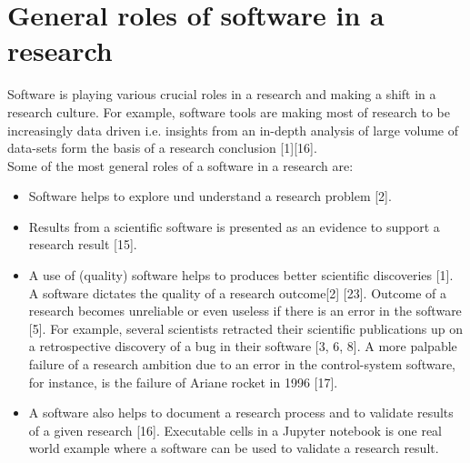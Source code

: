 \section{General roles of software in a research }
Software is playing various crucial roles in a research and making a shift in a research culture. For example, software tools are making most of research to be increasingly data driven i.e. insights from an in-depth analysis of large volume of data-sets form the basis of a research conclusion [1][16].\\
Some of the most general roles of a software in a research are:
\vspace{-5mm}   %
\begin{itemize}[noitemsep,topsep=0pt]
    \item Software helps to explore und understand a research problem [2].
    \item Results from a scientific software is presented as an evidence to support a research result [15]. 
    \item A use of (quality) software helps to produces better scientific discoveries [1]. A software dictates the quality of a research outcome[2] [23]. Outcome of a research becomes unreliable or even useless if there is an error in the software [5]. For example, several scientists retracted their scientific publications up on a retrospective discovery of a bug in their software [3, 6, 8]. A more palpable failure of a research ambition due to an error in the control-system software, for instance, is the failure of Ariane rocket in 1996 [17].  
    \item A software also helps to document a research process and to validate results of a given research [16]. Executable cells in a Jupyter notebook is one real world example where a software can be used to validate a research result.
\end{itemize}

